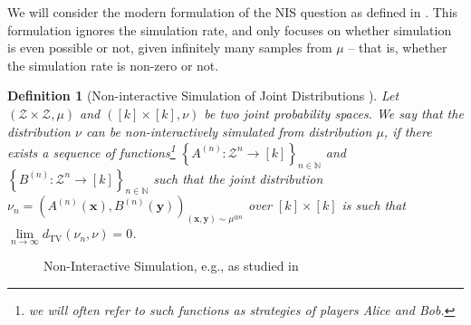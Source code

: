 \documentclass[11pt]{article}
\newcommand{\inbrace}[1]{\left \{ #1 \right \}}
\newcommand{\set}[1]{\inbrace{#1}}
\newcommand{\dTV}{d_{\mathrm{TV}}}
\newcommand{\bbN}{{\mathbb N}}
\newcommand{\bx}{{\bm x}}
\newcommand{\by}{{\bm y}}
\newcommand{\calZ}{\mathcal{Z}}
\newtheorem{defn}[theorem]{Definition}
\begin{document}
We will consider the modern formulation of the NIS question as defined in \cite{kamath2015non}. This formulation ignores the simulation rate, and only focuses on whether simulation is even possible or not, given infinitely many samples from $\mu$ -- that is, whether the simulation rate is non-zero or not.

\begin{defn}[Non-interactive Simulation of Joint Distributions \cite{kamath2015non}]
	Let $(\calZ \times \calZ, \mu)$ and $([k] \times [k], \nu)$ be two joint probability spaces. We say that the distribution $\nu$ can be {\em non-interactively simulated} from distribution $\mu$, if there exists a sequence of functions\footnote{we will often refer to such functions as {\em strategies} of players Alice and Bob.} $\set{A^{(n)} : \calZ^n \to [k]}_{n \in \bbN}$ and $\set{B^{(n)} : \calZ^n \to [k]}_{n \in \bbN}$ such that the joint distribution $\nu_n = (A^{(n)}(\bx), B^{(n)}(\by))_{(\bx, \by) \sim \mu^{\otimes n}}$ over $[k] \times [k]$ is such that $\lim\limits_{n \to \infty}\dTV(\nu_n, \nu) = 0$.
\end{defn}

\begin{figure}
\begin{center}
\caption{Non-Interactive Simulation, e.g., as studied in \cite{kamath2015non}}
\label{fig:non_int_sim}
\end{center}
\end{figure}%
\end{document}
